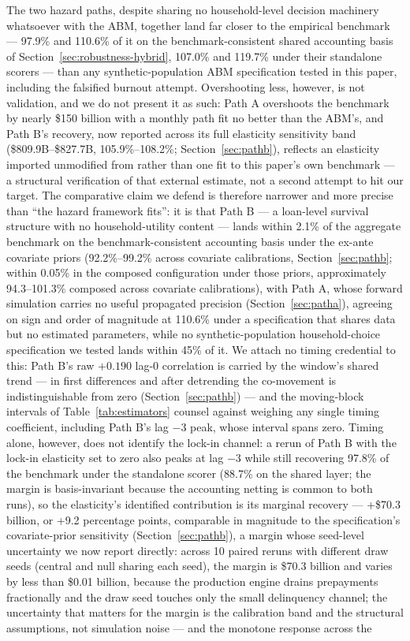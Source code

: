 \documentclass[12pt]{article}
\begin{document}
The two hazard paths, despite sharing no household-level decision machinery whatsoever with the ABM, together land far closer to the empirical benchmark --- 97.9\% and 110.6\% of it on the benchmark-consistent shared accounting basis of Section~\ref{sec:robustness-hybrid}, 107.0\% and 119.7\% under their standalone scorers --- than any synthetic-population ABM specification tested in this paper, including the falsified burnout attempt. Overshooting less, however, is not validation, and we do not present it as such: Path A overshoots the benchmark by nearly \$150 billion with a monthly path fit no better than the ABM's, and Path B's recovery, now reported across its full elasticity sensitivity band (\$809.9B--\$827.7B, 105.9\%--108.2\%; Section~\ref{sec:pathb}), reflects an elasticity imported unmodified from \citet{liebersohn2024} rather than one fit to this paper's own benchmark --- a structural verification of that external estimate, not a second attempt to hit our target. The comparative claim we defend is therefore narrower and more precise than ``the hazard framework fits'': it is that Path B --- a loan-level survival structure with no household-utility content --- lands within 2.1\% of the aggregate benchmark on the benchmark-consistent accounting basis under the ex-ante covariate priors (92.2\%--99.2\% across covariate calibrations, Section~\ref{sec:pathb}; within 0.05\% in the composed configuration under those priors, approximately 94.3--101.3\% composed across covariate calibrations), with Path A, whose forward simulation carries no useful propagated precision (Section~\ref{sec:patha}), agreeing on sign and order of magnitude at 110.6\% under a specification that shares data but no estimated parameters, while no synthetic-population household-choice specification we tested lands within 45\% of it. We attach no timing credential to this: Path B's raw $+0.190$ lag-0 correlation is carried by the window's shared trend --- in first differences and after detrending the co-movement is indistinguishable from zero (Section~\ref{sec:pathb}) --- and the moving-block intervals of Table~\ref{tab:estimators} counsel against weighing any single timing coefficient, including Path B's lag $-3$ peak, whose interval spans zero. Timing alone, however, does not identify the lock-in channel: a rerun of Path B with the lock-in elasticity set to zero also peaks at lag $-3$ while still recovering 97.8\% of the benchmark under the standalone scorer (88.7\% on the shared layer; the margin is basis-invariant because the accounting netting is common to both runs), so the elasticity's identified contribution is its marginal recovery --- +\$70.3 billion, or +9.2 percentage points, comparable in magnitude to the specification's covariate-prior sensitivity (Section~\ref{sec:pathb}), a margin whose seed-level uncertainty we now report directly: across 10 paired reruns with different draw seeds (central and null sharing each seed), the margin is \$70.3 billion and varies by less than \$0.01 billion, because the production engine drains prepayments fractionally and the draw seed touches only the small delinquency channel; the uncertainty that matters for the margin is the calibration band and the structural assumptions, not simulation noise --- and the monotone response across the 
\end{document}
